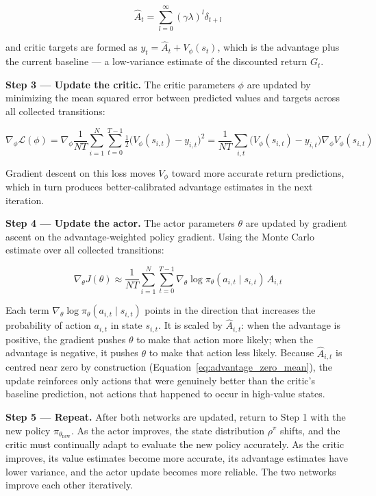 \documentclass{book}
\begin{document}
\begin{equation}
\label{eq:ac_gae}
\hat{A}_t = \sum_{l=0}^{\infty} (\gamma\lambda)^l \delta_{t+l}
\end{equation}

and critic targets are formed as $y_t = \hat{A}_t + V_\phi(s_t)$, which
is the advantage plus the current baseline --- a low-variance estimate
of the discounted return $G_t$.

\textbf{Step 3 --- Update the critic.} The critic parameters $\phi$ are
updated by minimizing the mean squared error between predicted values and
targets across all collected transitions:

\begin{equation}
\label{eq:ac_critic_update}
\nabla_\phi \mathcal{L}(\phi)
= \nabla_\phi \frac{1}{NT} \sum_{i=1}^{N} \sum_{t=0}^{T-1}
    \tfrac{1}{2}\bigl(V_\phi(s_{i,t}) - y_{i,t}\bigr)^2
= \frac{1}{NT} \sum_{i,t}
    \bigl(V_\phi(s_{i,t}) - y_{i,t}\bigr) \nabla_\phi V_\phi(s_{i,t})
\end{equation}

Gradient descent on this loss moves $V_\phi$ toward more accurate return
predictions, which in turn produces better-calibrated advantage estimates
in the next iteration.

\textbf{Step 4 --- Update the actor.} The actor parameters $\theta$ are
updated by gradient ascent on the advantage-weighted policy gradient. Using
the Monte Carlo estimate over all collected transitions:

\begin{equation}
\label{eq:ac_actor_update}
\nabla_\theta J(\theta)
\approx \frac{1}{NT} \sum_{i=1}^{N} \sum_{t=0}^{T-1}
    \nabla_\theta \log \pi_\theta(a_{i,t} \mid s_{i,t})\, \hat{A}_{i,t}
\end{equation}

Each term $\nabla_\theta \log \pi_\theta(a_{i,t} \mid s_{i,t})$ points in
the direction that increases the probability of action $a_{i,t}$ in state
$s_{i,t}$. It is scaled by $\hat{A}_{i,t}$: when the advantage is
positive, the gradient pushes $\theta$ to make that action more likely;
when the advantage is negative, it pushes $\theta$ to make that action
less likely. Because $\hat{A}_{i,t}$ is centred near zero by construction
(Equation~\ref{eq:advantage_zero_mean}), the update reinforces only actions
that were genuinely better than the critic's baseline prediction, not
actions that happened to occur in high-value states.

\textbf{Step 5 --- Repeat.} After both networks are updated, return to
Step 1 with the new policy $\pi_{\theta_{\text{new}}}$. As the actor
improves, the state distribution $\rho^\pi$ shifts, and the critic must
continually adapt to evaluate the new policy accurately. As the critic
improves, its value estimates become more accurate, its advantage estimates
have lower variance, and the actor update becomes more reliable. The two
networks improve each other iteratively.
\end{document}
